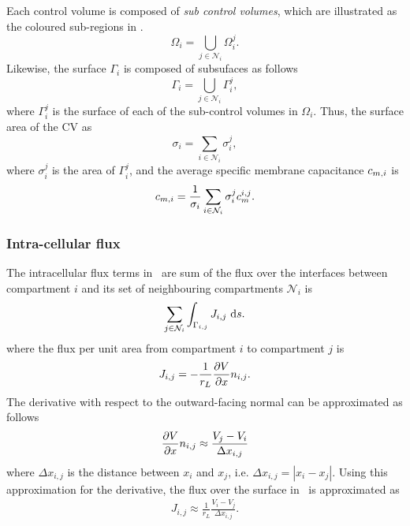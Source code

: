 Each control volume is composed of \emph{sub control volumes}, which are illustrated as the coloured sub-regions in .
\begin{equation*}
    \Omega_i = \bigcup_{j\in\mathcal{N}_i}{\Omega_i^j}.
\end{equation*}
Likewise, the surface $\Gamma_i$ is composed of subsufaces as follows
\begin{equation*}
    \Gamma_i = \bigcup_{j\in\mathcal{N}_i}{\Gamma_i^j},
\end{equation*}
where $\Gamma_i^j$ is the surface of each of the sub-control volumes in $\Omega_i$.
Thus, the surface area of the CV as
\begin{equation*}
    \sigma_i = \sum_{i\in\mathcal{N}_i}{\sigma_i^j},
\end{equation*}
where $\sigma_i^j$ is the area of $\Gamma_i^j$, and the average specific membrane capacitance $c_{m,i}$ is
\begin{equation*}
    c_{m,i} = \frac{1}{\sigma_i}\sum_{i\in\mathcal{N}_i}{\sigma_i^j c_m^{i,j}}.
\end{equation*}

\subsubsection{Intra-cellular flux}
The intracellular flux terms in~ are sum of the flux over the interfaces between compartment $i$ and its set of neighbouring compartments $\mathcal{N}_i$ is
\begin{equation}
    \sum_{j\in\mathcal{N}_i} { \int_{\Gamma_{i,j}} { J_{i,j} ~\text{d}{s} } }.
\end{equation}
where the flux per unit area from compartment $i$ to compartment $j$ is
\begin{align}
    J_{i,j} = - \frac{1}{r_L}\frac{\partial{V}}{\partial{x}} n_{i,j}.
    \label{eq:J_ij_exact}
\end{align}
The derivative with respect to the outward-facing normal can be approximated as follows
\begin{equation*}
    \frac{\partial{V}}{\partial{x}} n_{i,j} \approx \frac{V_j - V_i}{\Delta x_{i,j}}
\end{equation*}
where $\Delta x_{i,j}$ is the distance between $x_i$ and $x_j$, i.e. $\Delta x_{i,j}=|x_i-x_j|$.
Using this approximation for the derivative, the flux over the surface in~ is approximated as
\begin{align}
    J_{i,j} \approx \frac{1}{r_L}\frac{V_i - V_j}{\Delta x_{i,j}}.
    \label{eq:J_ij_intermediate}
\end{align}

